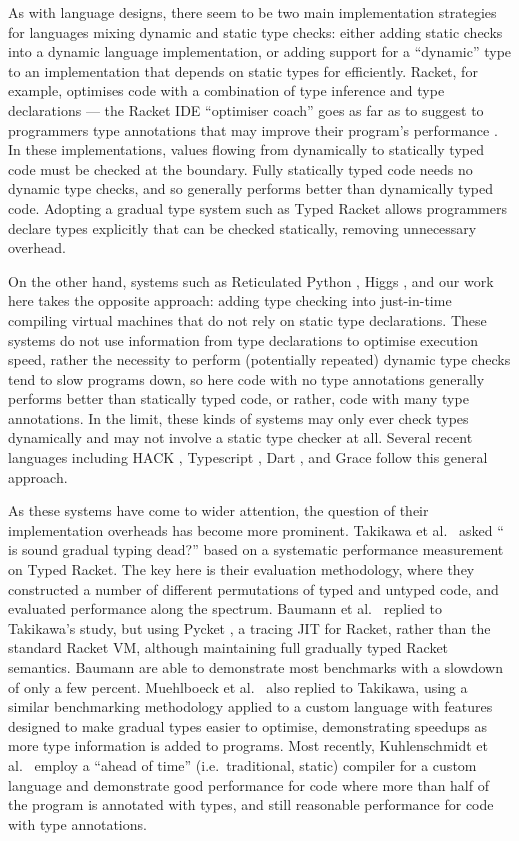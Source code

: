 As with language designs, there seem to be two main implementation
strategies for languages mixing dynamic and static type checks: either
adding static checks into a dynamic language implementation, or adding
support for a ``dynamic'' type to an implementation that depends on
static types for efficiently. Racket, for example, optimises code with
a combination of type inference and type declarations --- the Racket
IDE ``optimiser coach'' goes as far as to suggest to programmers type
annotations that may improve their program's performance
\cite{ShriramOptimiserCoach}. In these implementations, values flowing
from dynamically to statically typed code must be checked at the
boundary.  Fully statically typed code needs no dynamic type checks,
and so generally performs better than dynamically typed code. Adopting
a gradual type system such as Typed Racket \cite{TypedRacket} allows
programmers declare types explicitly that can be checked statically,
removing unnecessary overhead.

On the other hand, systems such as Reticulated Python
\cite{ReticulatedPython}, Higgs \cite{VM-aready-knew-that}, and our
work here takes the opposite approach: adding type checking into
just-in-time compiling virtual machines that do not rely on static
type declarations. These systems do not use information from type
declarations to optimise execution speed, rather the necessity to
perform (potentially repeated) dynamic type checks tend to slow
programs down, so here code with no type annotations generally
performs better than statically typed code, or rather, code with many
type annotations. In the limit, these kinds of systems may only ever
check types dynamically and may not involve a static type checker at
all.  Several recent languages including HACK \cite{HACK}, Typescript
\cite{typescript}, Dart \cite{dart}, and Grace \cite{grace} follow
this general approach.

As these systems have come to wider attention, the question of their
implementation overheads has become more prominent.  
Takikawa et al.\ \cite{Takikawa2016} asked `` is sound gradual typing
dead?'' based on a systematic performance measurement on Typed Racket.
The key here is their evaluation methodology, where they constructed a
number of different permutations of typed and untyped code, and
evaluated performance along the spectrum.
Baumann et al.\ \cite{Bauman2017} replied to Takikawa's study, but
using Pycket \cite{Pycketshortpaper}, a tracing JIT for Racket, rather
than the standard Racket VM, although maintaining full gradually typed
Racket semantics. Baumann are able to demonstrate most benchmarks
with a slowdown of only a few percent.
Muehlboeck et al.\ \cite{Muehlboeck2017} also replied to Takikawa, 
using a similar benchmarking methodology applied to a custom language
with features designed to make gradual types easier to optimise, 
demonstrating speedups as more type information is added to programs. 
Most recently, Kuhlenschmidt et al.\ \cite{Kuhlenschmidt2018} employ a
``ahead of time'' (i.e.\ traditional, static) compiler for a custom
language and demonstrate good performance for code where more than
half of the program is annotated with types, and still reasonable
performance for code with type annotations. 


